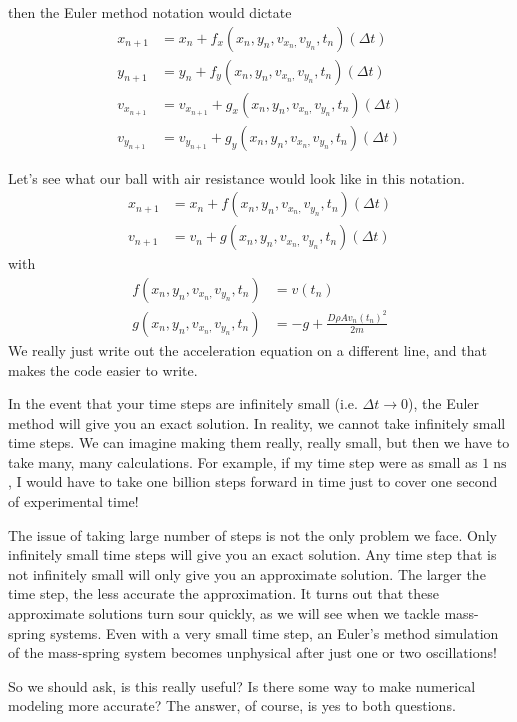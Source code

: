 \documentclass{book}
\begin{document}
then the Euler method notation would dictate
\begin{align*}
x_{n+1}  & =x_{n}+f_{x}(x_{n},y_{n},v_{x_{n},}v_{y_{n}},t_{n})(\Delta t)\\
y_{n+1}  & =y_{n}+f_{y}(x_{n},y_{n},v_{x_{n},}v_{y_{n}},t_{n})(\Delta t)\\
v_{x_{n+1}}  & =v_{x_{n+1}}+g_{x}(x_{n},y_{n},v_{x_{n},}v_{y_{n}} ,t_{n})(\Delta t)\\
v_{y_{n+1}}  & =v_{y_{n+1}}+g_{y}(x_{n},y_{n},v_{x_{n},}v_{y_{n}} ,t_{n})(\Delta t)
\end{align*}


Let's see what our ball with air resistance would look like in this notation. \begin{align*}
x_{n+1}  & =x_{n}+f(x_{n},y_{n},v_{x_{n},}v_{y_{n}},t_{n})(\Delta t)\\
v_{n+1}  & =v_{n}+g(x_{n},y_{n},v_{x_{n},}v_{y_{n}},t_{n})(\Delta t)
\end{align*}
with
\begin{align*}
f(x_{n},y_{n},v_{x_{n},}v_{y_{n}},t_{n})  & =v\left(  t_{n}\right) \\
g(x_{n},y_{n},v_{x_{n},}v_{y_{n}},t_{n})  & =-g+\frac{D\rho Av_{n}(t_{n})^{2} }{2m} \end{align*}
We really just write out the acceleration equation on a different line, and
that makes the code easier to write.

In the event that your time steps are infinitely small (i.e. $\Delta
t\rightarrow0$), the Euler method will give you an exact solution. In reality,
we cannot take infinitely small time steps. We can imagine making them really,
really small, but then we have to take many, many calculations. For example,
if my time step were as small as $1 \operatorname{ns} $, I would have to take one billion steps forward in time just to cover one
second of experimental time!

The issue of taking large number of steps is not the only problem we face.
Only infinitely small time steps will give you an exact solution. Any time
step that is not infinitely small will only give you an approximate solution.
The larger the time step, the less accurate the approximation. It turns out
that these approximate solutions turn sour quickly, as we will see when we
tackle mass-spring systems. Even with a very small time step, an Euler's
method simulation of the mass-spring system becomes unphysical after just one
or two oscillations!

So we should ask, is this really useful? Is there some way to make numerical
modeling more accurate? The answer, of course, is yes to both questions.
\end{document}
